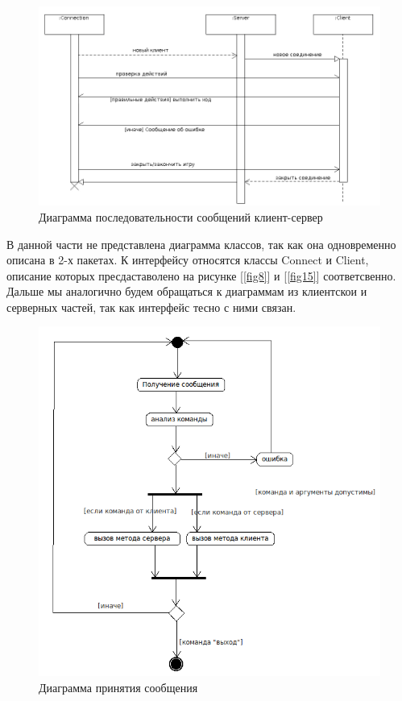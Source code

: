 \begin{figure}[ht]
\centering
\includegraphics[width=16cm]{images/par.png}
\caption{Диаграмма последовательности сообщений клиент-сервер}
\label{fig4}
\end{figure}

В данной части не представлена диаграмма классов, так как она одновременно описана в 2-х пакетах. К интерфейсу относятся классы Connect и Client, описание которых пресдаставолено на рисунке [\ref{fig8}] и [\ref{fig15}] соответсвенно. Дальше мы аналогично будем обращаться к диаграммам из клиентскои и серверных частей, так как интерфейс тесно с ними связан.

\begin{figure}[ht]
\centering
\includegraphics[width=12cm]{images/activity.png}
\caption{Диаграмма принятия сообщения}
\label{fig5}
\end{figure}

